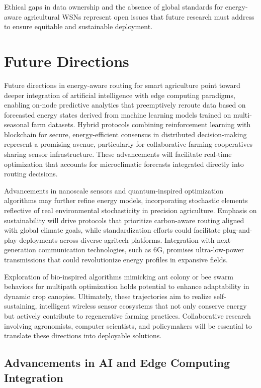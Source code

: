 \documentclass[12pt]{article}
\begin{document}
Ethical gaps in data ownership and the absence of global standards for energy-aware agricultural WSNs represent open issues that future research must address to ensure equitable and sustainable deployment.

\section{Future Directions}

Future directions in energy-aware routing for smart agriculture point toward deeper integration of artificial intelligence with edge computing paradigms, enabling on-node predictive analytics that preemptively reroute data based on forecasted energy states derived from machine learning models trained on multi-seasonal farm datasets. Hybrid protocols combining reinforcement learning with blockchain for secure, energy-efficient consensus in distributed decision-making represent a promising avenue, particularly for collaborative farming cooperatives sharing sensor infrastructure. These advancements will facilitate real-time optimization that accounts for microclimatic forecasts integrated directly into routing decisions.

Advancements in nanoscale sensors and quantum-inspired optimization algorithms may further refine energy models, incorporating stochastic elements reflective of real environmental stochasticity in precision agriculture. Emphasis on sustainability will drive protocols that prioritize carbon-aware routing aligned with global climate goals, while standardization efforts could facilitate plug-and-play deployments across diverse agritech platforms. Integration with next-generation communication technologies, such as 6G, promises ultra-low-power transmissions that could revolutionize energy profiles in expansive fields.

Exploration of bio-inspired algorithms mimicking ant colony or bee swarm behaviors for multipath optimization holds potential to enhance adaptability in dynamic crop canopies. Ultimately, these trajectories aim to realize self-sustaining, intelligent wireless sensor ecosystems that not only conserve energy but actively contribute to regenerative farming practices. Collaborative research involving agronomists, computer scientists, and policymakers will be essential to translate these directions into deployable solutions.

\subsection{Advancements in AI and Edge Computing Integration}
\end{document}
